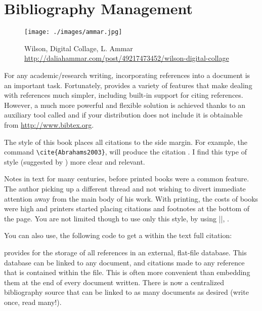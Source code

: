 \chapter{Bibliography Management} 

\begin{figure}[p]
\texttt{[image: ./images/ammar.jpg]}
\caption{Wilson, Digital Collage, L. Ammar \protect\url{http://daliahammar.com/post/49217473452/wilson-digital-collage}}
\end{figure}
 

       


For any academic/research writing, incorporating references into a document is an important task. Fortunately, \latex provides  a variety of features that make dealing with references much simpler, including built-in support for citing references. However, a much more powerful and flexible solution is achieved thanks to an auxiliary tool called \bibtex and if your \latex  distribution does not include it is obtainable from \url{http://www.bibtex.org}.


The style of this book places all citations to the side margin. For example, the command  \verb+\cite{Abrahams2003}+, will produce the citation \cite{Abrahams2003}. I find this type of style (suggested by \cite{Tufte1997}) more clear and relevant.

Notes in text for many centuries, before printed books were a common feature. The author picking up a different thread and not wishing to divert immediate attention away from the main body of his work. With printing, the costs of books were high and printers started placing citations and footnotes at the bottom of the page. You are not limited though to use only this style, by using |\cite{Bringhurst2005}|, \citet{Bringhurst2005}.

You can also use, the following code to get a within the text full citation:





\bibtex provides for the storage of all references in an external, flat-file database. This database can be linked to any \latex document, and citations made to any reference that is contained within the file. This is often more convenient than embedding them at the end of every document written. There is now a centralized bibliography source that can be linked to as many documents as desired (write once, read many!). 

